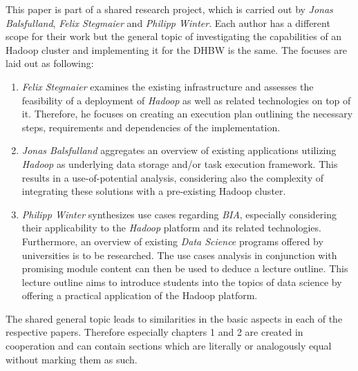 This paper is part of a shared research project,
which is carried out by \emph{Jonas Balsfulland}, \emph{Felix Stegmaier} and \emph{Philipp Winter}.
Each author has a different scope for their work 
but the general topic of investigating the capabilities of an Hadoop cluster 
and implementing it for the \ac{DHBW} is the same.
The focuses are laid out as following:

\begin{enumerate}
	\item \emph{Felix Stegmaier} examines the existing infrastructure and assesses the feasibility of a deployment of \emph{Hadoop} as well as related technologies on top of it. Therefore, he focuses on creating an execution plan outlining the necessary steps, requirements and dependencies of the implementation.
	\item \emph{Jonas Balsfulland} aggregates an overview of existing applications utilizing \emph{Hadoop} as underlying data storage and/or task execution framework. This results in a use-of-potential analysis, considering also the complexity of integrating these solutions with a pre-existing Hadoop cluster.
	\item \emph{Philipp Winter} synthesizes use cases regarding \emph{\ac{BIA}}, especially considering their applicability to the \emph{Hadoop} platform and its related technologies. Furthermore, an overview of existing \emph{Data Science} programs offered by universities is to be researched. The use cases analysis in conjunction with promising module content can then be used to deduce a lecture outline. This lecture outline aims to introduce students into the topics of data science by offering a practical application of the Hadoop platform.
\end{enumerate}

The shared general topic leads to similarities in the basic aspects in each of the respective papers.
Therefore especially chapters 1 and 2 are created in cooperation 
and can contain sections which are literally or analogously equal without marking them as such.
